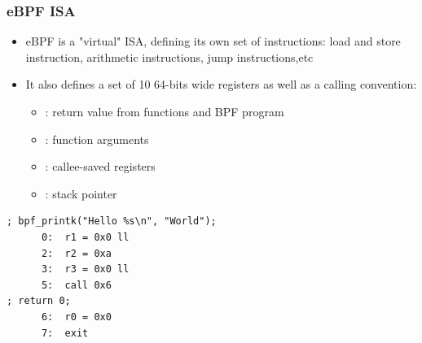 \begin{frame}[fragile]
  \frametitle{eBPF ISA}
  \begin{itemize}
    \item eBPF is a "virtual" ISA, defining its own set of instructions: load
    and store instruction, arithmetic instructions, jump instructions,etc
    \item It also defines a set of 10 64-bits wide registers as well as a
    calling convention:
    \begin{itemize}
      \item {}: return value from functions and BPF program
      \item {}: function arguments
      \item {}: callee-saved registers
      \item {}: stack pointer
    \end{itemize}
  \end{itemize}
  \begin{block}{}
    \begin{verbatim}
; bpf_printk("Hello %s\n", "World");
      0:  r1 = 0x0 ll
      2:  r2 = 0xa
      3:  r3 = 0x0 ll
      5:  call 0x6
; return 0;
      6:  r0 = 0x0
      7:  exit
    \end{verbatim}
  \end{block}
\end{frame}

